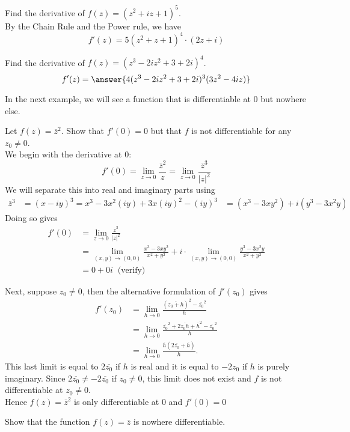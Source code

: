 \documentclass[handout]{ximera}
\begin{document}
\begin{example}
Find the derivative of $f(z) = (z^2 + iz + 1)^5$.\\
By the Chain Rule and the Power rule, we have
\[
f'(z) = 5(z^2 + z + 1)^4 \cdot (2z +i)
\]
\end{example}

\begin{problem}
Find the derivative of $f(z) = (z^3 - 2iz^2 + 3 + 2i)^4$.\\
\[
f'(z) = \answer{4(z^3 - 2iz^2 + 3 + 2i)^3 (3z^2 -4iz)}
\]

\end{problem}
In the next example, we will see a function that is differentiable at $0$ but nowhere else.

\begin{example}
Let $f(z) = \overline{z}^2$.  Show that $f'(0) = 0$ but that $f$ is not differentiable for any $z_0 \neq 0$.\\
We begin with the derivative at $0$:
\[
f'(0) = \lim_{z \to  0} \frac{\overline{z}^2}{z} = \lim_{z \to  0} \frac{\overline{z}^3}{|z|^2}
\]
We will separate this into real and imaginary parts using 
\begin{align*}
\overline{z}^3 &= (x -iy)^3 = x^3 - 3x^2(iy) + 3x(iy)^2  - (iy)^3 
              &= (x^3 -3xy^2) + i(y^3 - 3x^2y)
\end{align*}
Doing so gives
\begin{align*}
f'(0) &= \lim_{z \to  0} \frac{\overline{z}^3}{|z|^2}\\
      &= \lim_{(x,y) \to (0,0)} \frac{x^3 -3xy^2}{x^2 +y^2} + i\cdot \lim_{(x,y) \to (0,0)} \frac{y^3 - 3x^2y}{x^2 +y^2}\\
      & = 0 + 0i \;\; \mbox{(verify)}
\end{align*}

Next, suppose $z_0 \neq 0$, then the alternative formulation of $f'(z_0)$ gives
\begin{align*}
f'(z_0) &= \lim_{h \to 0} \frac{\left(\overline{z_0 + h}\right)^2-\overline{z_0}^2 }{h}\\[6pt]
        &=\lim_{h \to 0} \frac{\overline{z_0}^2 +2\overline{z_0h}+ \overline{h}^2 -\overline{z_0}^2 }{h}\\[6pt]
        &=\lim_{h \to 0} \frac{\overline{h} \left(2\overline{z_0}+ \overline{h}\right)}{h}.
\end{align*}
This last limit is equal to $2\overline{z_0}$ if $h$ is real and it is equal to $-2z_0$ if $h$ is purely imaginary.
Since $2\overline{z_0} \neq -2\overline{z_0}$ if $z_0 \neq 0$, this limit does not exist and $f$ is not differentiable at $z_0 \neq 0$.\\
Hence $f(z) = \overline{z}^2$ is only differentiable at $0$ and $f'(0) = 0$

\end{example}


\begin{problem}
Show that the function $f(z) = \overline{z}$ is nowhere differentiable.
\end{problem}
\end{document}
